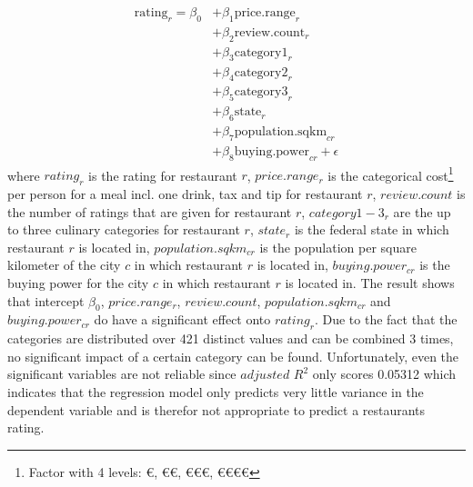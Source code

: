 \begin{equation}
	\begin{aligned}
	\mathrm{rating}_{r} = \beta_{0}
	&+ \beta_{1}  \mathrm{price.range}_{r} \\
	&+ \beta_{2}  \mathrm{review.count}_{r} \\
	&+ \beta_{3}  \mathrm{category1}_{r}    \\
	&+ \beta_{4}  \mathrm{category2}_{r} \\
	&+ \beta_{5}  \mathrm{category3}_{r} \\
	&+ \beta_{6}  \mathrm{state}_{r}   \\
	&+ \beta_{7}  \mathrm{population.sqkm}_{cr}  \\
	&+ \beta_{8}  \mathrm{buying.power}_{cr} + \epsilon
	\end{aligned}
	\label{eq:rating_regression}
\end{equation}
where $rating_r$ is the rating for restaurant $r$, $price.range_r$ is the categorical cost\footnote{Factor with 4 levels: \euro, \euro\euro, \euro\euro\euro, \euro\euro\euro\euro} per person for a meal incl. one drink, tax and tip for restaurant $r$, $review.count$ is the number of ratings that are given for restaurant $r$, $category1-3_r$ are the up to three culinary categories for restaurant $r$, $state_r$ is the federal state in which restaurant $r$ is located in, $population.sqkm_{cr}$ is the population per square kilometer of the city $c$ in which restaurant $r$ is located in, $buying.power_{cr}$ is the buying power for the city $c$ in which restaurant $r$ is located in. \newline
The result shows that  intercept $\beta_{0}$, $price.range_r$, $review.count$, $population.sqkm_{cr}$ and
$buying.power_{cr}$ do have a significant effect onto $rating_r$. Due to the fact that the categories are distributed over 421 distinct values and can be combined 3 times, no significant impact of a certain category can be found. Unfortunately, even the significant variables are not reliable since $adjusted$ $ R^2$ only scores 0.05312 which indicates that the regression model only predicts very little variance in the dependent variable and is therefor not appropriate to predict a restaurants rating.


